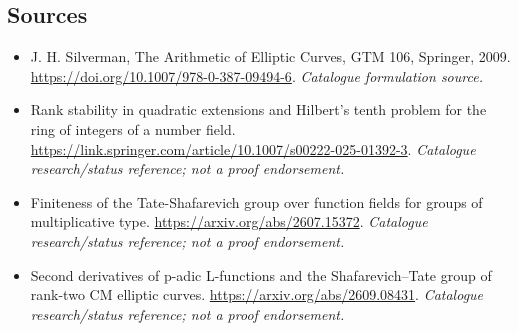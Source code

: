\documentclass[11pt,a4paper]{article}
\numberwithin{equation}{section}
\begin{document}
\subsection{Sources}
\begin{itemize}\raggedright
\item[\textnormal{[S1]}]\hypertarget{source:30006701:1}{} J. H. Silverman, The Arithmetic of Elliptic Curves, GTM 106, Springer, 2009.
\url{https://doi.org/10.1007/978-0-387-09494-6}.
{\small\textit{Catalogue formulation source.}}
\item[\textnormal{[S2]}]\hypertarget{source:30006701:2}{} Rank stability in quadratic extensions and Hilbert’s tenth problem for the ring of integers of a number field.
\url{https://link.springer.com/article/10.1007/s00222-025-01392-3}.
{\small\textit{Catalogue research/status reference; not a proof endorsement.}}
\item[\textnormal{[S3]}]\hypertarget{source:30006701:3}{} Finiteness of the Tate-Shafarevich group over function fields for groups of multiplicative type.
\url{https://arxiv.org/abs/2607.15372}.
{\small\textit{Catalogue research/status reference; not a proof endorsement.}}
\item[\textnormal{[S4]}]\hypertarget{source:30006701:4}{} Second derivatives of p-adic L-functions and the Shafarevich–Tate group of rank-two CM elliptic curves.
\url{https://arxiv.org/abs/2609.08431}.
{\small\textit{Catalogue research/status reference; not a proof endorsement.}}


\end{itemize}
\end{document}
